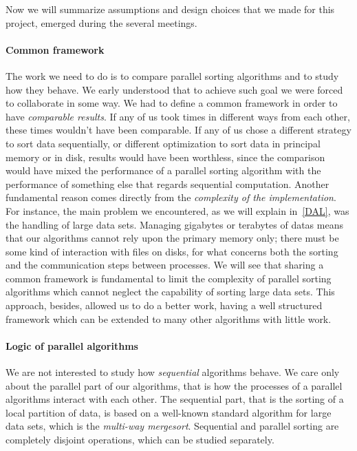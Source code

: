 Now we will summarize assumptions and design choices that we made for this project, emerged during the several meetings. 

\paragraph{Common framework} The work we need to do is to compare parallel sorting algorithms and to study how they behave. We early understood that to achieve such goal we were forced to collaborate in some way. We had to define a common framework in order to have \textit{comparable results}. If any of us took times in different ways from each other, these times wouldn't have been comparable. If any of us chose a different strategy to sort data sequentially, or different optimization to sort data in principal memory or in disk, results would have been worthless, since the comparison would have mixed the performance of a parallel sorting algorithm with the performance of something else that regards sequential computation. Another fundamental reason comes directly from the \textit{complexity of the implementation}. For instance, the main problem we encountered, as we will explain in~\ref{DAL}, was the handling of large data sets. Managing gigabytes or terabytes of datas means that our algorithms cannot rely upon the primary memory only; there must be some kind of interaction with files on disks, for what concerns both the sorting and the communication steps between processes. We will see that sharing a common framework is fundamental to limit the complexity of parallel sorting algorithms which cannot neglect the capability of sorting large data sets. This approach, besides, allowed us to do a better work, having a well structured framework which can be extended to many other algorithms with little work.

\paragraph{Logic of parallel algorithms} We are not interested to study how \textit{sequential} algorithms behave. We care only about the parallel part of our algorithms, that is how the processes of a parallel algorithms interact with each other. The sequential part, that is the sorting of a local partition of data, is based on a well-known standard algorithm for large data sets, which is the \textit{multi-way mergesort}. Sequential and parallel sorting are completely disjoint operations, which can be studied separately.

